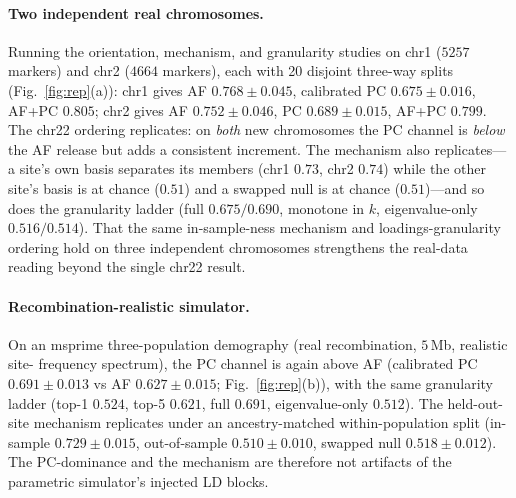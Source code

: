 \documentclass[11pt]{article}
\begin{document}
\paragraph{Two independent real chromosomes.} Running the orientation,
mechanism, and granularity studies on chr1 ($5257$ markers) and chr2 ($4664$
markers), each with 20 disjoint three-way splits (Fig.~\ref{fig:rep}(a)):
chr1 gives AF $0.768 \pm 0.045$, calibrated PC $0.675 \pm 0.016$, AF+PC
$0.805$; chr2 gives AF $0.752 \pm 0.046$, PC $0.689 \pm 0.015$, AF+PC $0.799$.
The chr22 ordering replicates: on \emph{both} new chromosomes the PC channel is
\emph{below} the AF release but adds a consistent increment. The mechanism also
replicates---a site's own basis separates its members (chr1 $0.73$, chr2
$0.74$) while the other site's basis is at chance ($0.51$) and a swapped null
is at chance ($0.51$)---and so does the granularity ladder (full $0.675/0.690$,
monotone in $k$, eigenvalue-only $0.516/0.514$). That the same
in-sample-ness mechanism and loadings-granularity ordering hold on three
independent chromosomes strengthens the real-data reading beyond the single
chr22 result.

\paragraph{Recombination-realistic simulator.} On an msprime
three-population demography (real recombination, $5$\,Mb, realistic site-
frequency spectrum), the PC channel is again above AF (calibrated PC
$0.691 \pm 0.013$ vs AF $0.627 \pm 0.015$; Fig.~\ref{fig:rep}(b)), with the same
granularity ladder (top-1 $0.524$, top-5 $0.621$, full $0.691$, eigenvalue-only
$0.512$). The held-out-site mechanism replicates under an ancestry-matched
within-population split (in-sample $0.729 \pm 0.015$, out-of-sample
$0.510 \pm 0.010$, swapped null $0.518 \pm 0.012$). The PC-dominance and the
mechanism are therefore not artifacts of the parametric simulator's injected LD
blocks.
\end{document}
